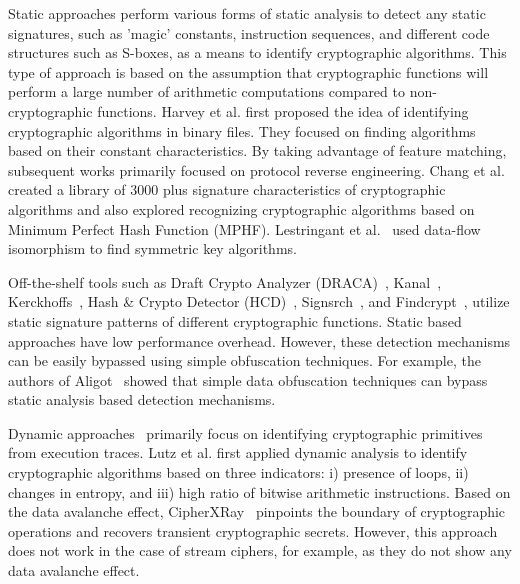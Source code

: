 
 Static approaches perform various forms of static analysis to detect
any static signatures, such as 'magic' constants, instruction sequences, and different code structures
such as S-boxes, as a means to identify cryptographic algorithms. This type of approach is based on the assumption that
cryptographic functions will perform a large number of arithmetic computations compared to non-cryptographic functions.
Harvey et al. \cite{harvey2001cipher} first proposed the idea of identifying cryptographic algorithms in binary files.
They focused on finding algorithms based on their constant
characteristics. By taking advantage of feature matching, subsequent
works \cite{lin2008automatic,caballero2007polyglot,wang2009reformat}
primarily focused on protocol reverse engineering. 
Chang et al. \cite{chang2014cryptographic} created a library of 3000 plus signature characteristics of cryptographic algorithms and also explored recognizing cryptographic algorithms based on Minimum Perfect Hash Function (MPHF).
Lestringant et al.~\cite{lestringant2015automated} used
data-flow isomorphism to find symmetric key algorithms.

Off-the-shelf tools such as Draft Crypto Analyzer
(DRACA)~\cite{draca}, Kanal~\cite{kanal}, Kerckhoffs~\cite{kerckhoffs},
Hash \& Crypto Detector (HCD)~\cite{hcd}, Signsrch~\cite{signsrch}, and Findcrypt~\cite{findcrypt2}, 
utilize static signature patterns of different cryptographic functions.
Static based approaches have low performance overhead. However, these
detection mechanisms can be easily bypassed using simple obfuscation techniques. For example,
the authors of Aligot~\cite{calvet2012aligot} showed that simple data obfuscation techniques
can bypass static analysis based detection mechanisms.


 Dynamic approaches~\cite{xu2017cryptographic,calvet2012aligot,li2012cipherxray}
primarily focus on identifying cryptographic primitives
from execution traces.
Lutz et al. \cite{lutz2008towards} first applied dynamic analysis to identify cryptographic algorithms based on three indicators:
i) presence of loops, ii) changes in entropy, and iii) high ratio of bitwise
arithmetic instructions.
Based on the data avalanche effect, CipherXRay~\cite{li2012cipherxray}
pinpoints the boundary of cryptographic operations and recovers transient
cryptographic secrets. However, this approach does not work in the case of stream
ciphers, for example, as they do not show any data avalanche effect.

